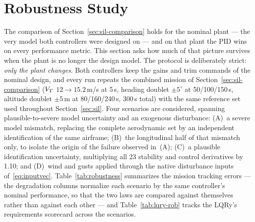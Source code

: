 \section{Robustness Study}
\label{sec:robustness}

The comparison of Section~\ref{sec:sil-comparison} holds for the nominal
plant --- the very model both controllers were designed on --- and on
that plant the PID wins on every performance metric. This section asks
how much of that picture survives when the plant is no longer the
design model. The protocol is deliberately strict: \emph{only the plant
changes}. Both controllers keep the gains and trim commands of the nominal
design, and every run repeats the combined mission of
Section~\ref{sec:sil-comparison} ($V_T$ $12\!\to\!15.2$\,m/s at 5\,s,
heading doublet $\pm5^\circ$ at 50/100/150\,s, altitude doublet
$\pm5$\,m at 80/160/240\,s, 300\,s total) with the same reference set
used throughout Section~\ref{sec:sil}. Four scenarios are considered,
spanning plausible-to-severe model uncertainty and an exogenous
disturbance: (A)~a severe model mismatch, replacing the complete
aerodynamic set by an independent identification of the same airframe;
(B)~the longitudinal half of that mismatch only, to isolate the origin of
the failure observed in~(A); (C)~a plausible identification uncertainty,
multiplying all 23 stability and control derivatives by 1.10; and (D)~wind
and gusts applied through the native disturbance inputs
of~\eqref{eq:inputvec}. Table~\ref{tab:robustness} summarizes the mission
tracking errors --- the degradation columns normalize each scenario by the
same controller's nominal performance, so that the two laws are compared
against themselves rather than against each other --- and
Table~\ref{tab:lqry-rob} tracks the LQRy's requirements scorecard across
the scenarios.

